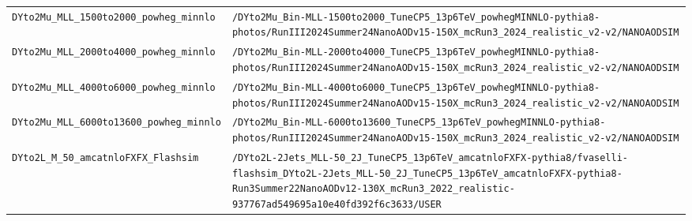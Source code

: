 \begin{longtable}{@{}>{\RaggedRight\arraybackslash}p{} >{\RaggedRight\arraybackslash}p{}@{}}
\addlinespace[2pt]
\texttt{DYto2Mu\_\allowbreak{}MLL\_\allowbreak{}1500to2000\_\allowbreak{}powheg\_\allowbreak{}minnlo} & \texttt{/\allowbreak{}DYto2Mu\_\allowbreak{}Bin-\allowbreak{}MLL-\allowbreak{}1500to2000\_\allowbreak{}TuneCP5\_\allowbreak{}13p6TeV\_\allowbreak{}powhegMINNLO-\allowbreak{}pythia8-\allowbreak{}photos/\allowbreak{}RunIII2024Summer24NanoAODv15-\allowbreak{}150X\_\allowbreak{}mcRun3\_\allowbreak{}2024\_\allowbreak{}realistic\_\allowbreak{}v2-\allowbreak{}v2/\allowbreak{}NANOAODSIM} \\
\addlinespace[2pt]
\texttt{DYto2Mu\_\allowbreak{}MLL\_\allowbreak{}2000to4000\_\allowbreak{}powheg\_\allowbreak{}minnlo} & \texttt{/\allowbreak{}DYto2Mu\_\allowbreak{}Bin-\allowbreak{}MLL-\allowbreak{}2000to4000\_\allowbreak{}TuneCP5\_\allowbreak{}13p6TeV\_\allowbreak{}powhegMINNLO-\allowbreak{}pythia8-\allowbreak{}photos/\allowbreak{}RunIII2024Summer24NanoAODv15-\allowbreak{}150X\_\allowbreak{}mcRun3\_\allowbreak{}2024\_\allowbreak{}realistic\_\allowbreak{}v2-\allowbreak{}v2/\allowbreak{}NANOAODSIM} \\
\addlinespace[2pt]
\texttt{DYto2Mu\_\allowbreak{}MLL\_\allowbreak{}4000to6000\_\allowbreak{}powheg\_\allowbreak{}minnlo} & \texttt{/\allowbreak{}DYto2Mu\_\allowbreak{}Bin-\allowbreak{}MLL-\allowbreak{}4000to6000\_\allowbreak{}TuneCP5\_\allowbreak{}13p6TeV\_\allowbreak{}powhegMINNLO-\allowbreak{}pythia8-\allowbreak{}photos/\allowbreak{}RunIII2024Summer24NanoAODv15-\allowbreak{}150X\_\allowbreak{}mcRun3\_\allowbreak{}2024\_\allowbreak{}realistic\_\allowbreak{}v2-\allowbreak{}v2/\allowbreak{}NANOAODSIM} \\
\addlinespace[2pt]
\texttt{DYto2Mu\_\allowbreak{}MLL\_\allowbreak{}6000to13600\_\allowbreak{}powheg\_\allowbreak{}minnlo} & \texttt{/\allowbreak{}DYto2Mu\_\allowbreak{}Bin-\allowbreak{}MLL-\allowbreak{}6000to13600\_\allowbreak{}TuneCP5\_\allowbreak{}13p6TeV\_\allowbreak{}powhegMINNLO-\allowbreak{}pythia8-\allowbreak{}photos/\allowbreak{}RunIII2024Summer24NanoAODv15-\allowbreak{}150X\_\allowbreak{}mcRun3\_\allowbreak{}2024\_\allowbreak{}realistic\_\allowbreak{}v2-\allowbreak{}v2/\allowbreak{}NANOAODSIM} \\
\addlinespace[2pt]
\texttt{DYto2L\_\allowbreak{}M\_\allowbreak{}50\_\allowbreak{}amcatnloFXFX\_\allowbreak{}Flashsim} & \texttt{/\allowbreak{}DYto2L-\allowbreak{}2Jets\_\allowbreak{}MLL-\allowbreak{}50\_\allowbreak{}2J\_\allowbreak{}TuneCP5\_\allowbreak{}13p6TeV\_\allowbreak{}amcatnloFXFX-\allowbreak{}pythia8/\allowbreak{}fvaselli-\allowbreak{}flashsim\_\allowbreak{}DYto2L-\allowbreak{}2Jets\_\allowbreak{}MLL-\allowbreak{}50\_\allowbreak{}2J\_\allowbreak{}TuneCP5\_\allowbreak{}13p6TeV\_\allowbreak{}amcatnloFXFX-\allowbreak{}pythia8-\allowbreak{}Run3Summer22NanoAODv12-\allowbreak{}130X\_\allowbreak{}mcRun3\_\allowbreak{}2022\_\allowbreak{}realistic-\allowbreak{}937767ad549695a10e40fd392f6c3633/\allowbreak{}USER} \\

\end{longtable}

